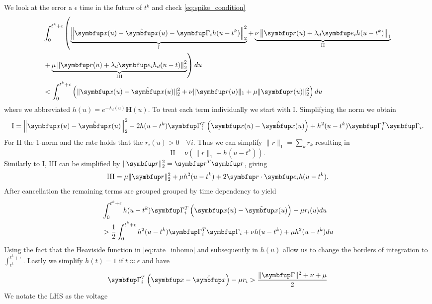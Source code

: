 We look at the error a $\epsilon$ time in the future of $t^k$ and check \cref{eq:spike_condition}
\begin{equation}
\begin{aligned}
& \int_0^{t^k+\epsilon} \left(\underbrace{\left\|\bmu{x}(u)-\hat{\bmu{x}}(u)-\bmu{\Gamma}_i h(u-t^k)\right\|_2^2}_{\text{I}}+
\underbrace{\nu\left\|\bmu{r}(u)+\lambda_d \bmu{e}_i h(u-t^k)\right\|_1}_{\text{II}}\right.\\
& \left.+\underbrace{\mu\left\|\bmu{r}(u)+\lambda_d \bmu{e}_i h_d(u-t)\right\|_2^2}_{\text{III}}\right) d u\\
& <\int_0^{t^k+\epsilon} \left(\|\bmu{x}(u)-\hat{\bmu{x}}(u)\|_2^2+\nu\|\bmu{r}(u)\|_1+\mu\|\bmu{r}(u)\|_2^2\right)d u
\end{aligned}
\end{equation}
where we abbreviated $h(u) = e^{-\lambda_d (u)} \bm{H}(u)$.
To treat each term individually we start with I. Simplifying the norm we obtain
\begin{equation}
	\text{I} = \left\|\bmu{x}(u)-\hat{\bmu{x}}(u)\right\|_2^2 -2h(u-t^k)\bmu{\Gamma}_i^T\left(\bmu{x}(u)-\hat{\bmu{x}}(u)\right) + h^2(u-t^k)\bmu{\Gamma}_i^T\bmu{\Gamma}_i.
\end{equation}
For II the 1-norm and the rate holds that the $r_i(u)>0 \quad
\forall i$. Thus we can simplify $\|r\|_1 = \sum_k r_k$ resulting in
\begin{equation}
	\text{II} = \nu\left(\|r\|_1 + h(u-t^k)\right).
\end{equation}
Similarly to I, III can be simplified by $\|\bmu{r}\|^2_2 = \bmu{r}^T\bmu{r}$, giving
\begin{equation}
	\text{III} = \mu\|\bmu{r}\|^2_2 + \mu h^2(u-t^k) + 2\bmu{r}\cdot\bmu{e}_ih(u-t^k).
\end{equation}
After cancellation the remaining terms are grouped grouped by time dependency to yield
\begin{equation}
\begin{aligned}
	&\int_0^{t^k+\epsilon}h(u-t^k)\bmu{\Gamma}_i^T\left(\bmu{x}(u)-\hat{\bmu{x}}(u)\right) - \mu r_i(u) d u \\
	&> \frac{1}{2} \int_0^{t^k+\epsilon} 	h^2(u-t^k)\bmu{\Gamma}_i^T\bmu{\Gamma}_i + 	\nu h(u-t^k) + \mu h^2(u-t^k) d u
\end{aligned}
\end{equation}
Using the fact that the Heaviside function in \cref{eq:rate_inhomo} and subsequently in $h(u)$ allow us to change the borders of integration to $\int_{t^k}^{t^k+\epsilon}$. Lastly we simplify $h(t) = 1$ if $t\approx \epsilon$ and have
\begin{equation}
	\bmu{\Gamma}_i^T\left(\bmu{x}-\hat{\bmu{x}}\right) - \mu r_i>\frac{\|\bmu{\Gamma}\|^2 + \nu + \mu}{2}
\end{equation}
We notate the \ac{LHS} as the voltage

